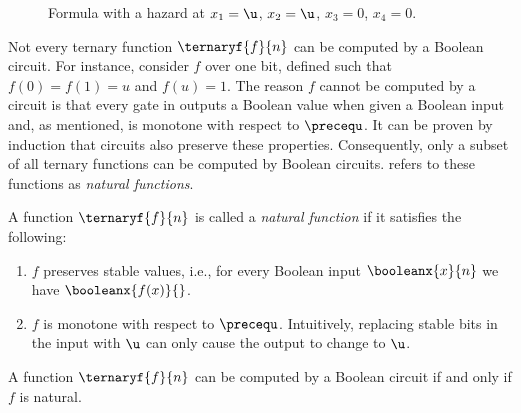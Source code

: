 \documentclass[acmsmall, nonacm, authorversion]{acmart}
\begin{document}
\begin{figure}
\centering
{}
\caption{Formula with a hazard at $x_1=\u$, $x_2=\u$, $x_3=0$, $x_4=0$.}
\label{fig:formula-with-hazard-example}
\end{figure}

Not every ternary function $\ternaryf{f}{n}$ can be computed by a Boolean circuit. For instance, consider $f$ over one bit, defined such that $f(0)=f(1)=u$ and $f(u)=1$. The reason $f$ cannot be computed by a circuit is that every gate in  outputs a Boolean value when given a Boolean input and, as mentioned, is monotone with respect to $\precequ$. It can be proven by induction that circuits also preserve these properties.
Consequently, only a subset of all ternary functions can be computed by Boolean circuits. \cite{Muk72} refers to these functions as \emph{natural functions}.

\begin{definition}\label{def:natural-function} 
A function $\ternaryf{f}{n}$ is called a \emph{natural function} if it satisfies the following:
\begin{enumerate} 
    \item $f$ preserves stable values, i.e., for every Boolean input $\booleanx{x}{n}$ we have $\booleanx{f(x)}{}$.
    \item $f$ is monotone with respect to $\precequ$. Intuitively, replacing stable bits in the input with $\u$ can only cause the output to change to $\u$.
\end{enumerate}
\end{definition}

\begin{proposition}\label{prop:natural-circuits}
A function $\ternaryf{f}{n}$ can be computed by a Boolean circuit if and only if $f$ is natural.
\end{proposition}
\end{document}
